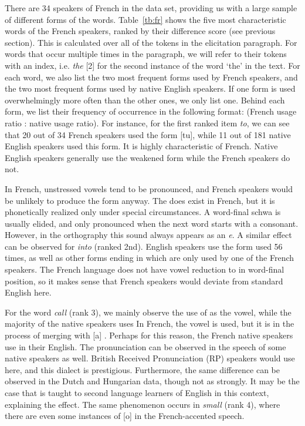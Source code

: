 \documentclass[output=paper]{LSP/langsci}
\begin{document}
There are 34 speakers of French in the data set, providing us with a large sample of different forms of the words. Table~\ref{tb:fr} shows the five most characteristic words of the French speakers, ranked by their difference score (see previous section). This is calculated over all of the tokens in the elicitation paragraph. For words that occur multiple times in the paragraph, we will refer to their tokens with an index, i.e. \textit{the} [2] for the second instance of the word `the' in the text. For each word, we also list the two most frequent forms used by French speakers, and the two most frequent forms used by native English speakers. If one form is used overwhelmingly more often than the other ones, we only list one. Behind each form, we list their frequency of occurrence in the following format: (French usage ratio : native usage ratio). For instance, for the first ranked item \textit{to}, we can see that 20 out of 34 French speakers used the form [tu], while 11 out of 181 native English speakers used this form. It is highly characteristic of French. Native English speakers generally use the weakened form 
while the French speakers do not. 

In French, unstressed vowels tend to be pronounced, and French speakers would be unlikely to produce the form 
anyway. The 
does exist in French, but it is phonetically realized only under special circumstances. A word-final schwa is usually elided, and only pronounced when the next word starts with a consonant. However, in the orthography this sound always appears as an \textit{e}. A similar effect can be observed for \textit{into} (ranked 2nd). English speakers use the form 
used 56 times, as well as other forms ending in 
which are only used by one of the French speakers. The French language does not have vowel reduction to 
in word-final position, so it makes sense that French speakers would deviate from standard English here.

For the word \textit{call} (rank 3), we mainly observe the use of 
as the vowel, while the majority of the native speakers uses %
In French, the vowel 
is used, but it is in the process of merging with [a] \citep[pp. 60-62]{walker_french_2001}. Perhaps for this reason, the French native speakers use 
in their English. The 
pronunciation can be observed in the speech of some native speakers as well. British Received Pronunciation (RP) speakers would use 
here, and this dialect is prestigious. Furthermore, the same difference can be observed in the Dutch and Hungarian data, though not as strongly. It may be the case that 
is taught to second language learners of English in this context, explaining the effect. The same phenomenon occurs in \textit{small} (rank 4), where there are even some instances of [o] in the French-accented speech.
\end{document}
